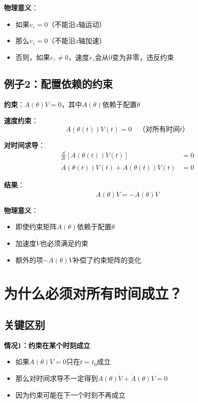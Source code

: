 \documentclass[12pt,a4paper]{article}
\begin{document}
\textbf{物理意义}：
\begin{itemize}
\item 如果$v_z = 0$（不能沿$z$轴运动）
\item 那么$\dot{v}_z = 0$（不能沿$z$轴加速）
\item 否则，如果$\dot{v}_z \neq 0$，速度$v_z$会从$0$变为非零，违反约束
\end{itemize}

\subsection{例子2：配置依赖的约束}

\textbf{约束}：$A(\theta)V = 0$，其中$A(\theta)$依赖于配置$\theta$

\textbf{速度约束}：
\begin{equation}
A(\theta(t))V(t) = 0 \quad \text{（对所有时间$t$）}
\end{equation}

\textbf{对时间求导}：
\begin{align}
\frac{d}{dt}[A(\theta(t))V(t)] &= 0 \\
\dot{A}(\theta(t))V(t) + A(\theta(t))\dot{V}(t) &= 0
\end{align}

\textbf{结果}：
\begin{equation}
A(\theta)\dot{V} = -\dot{A}(\theta)V
\end{equation}

\textbf{物理意义}：
\begin{itemize}
\item 即使约束矩阵$A(\theta)$依赖于配置$\theta$
\item 加速度$\dot{V}$也必须满足约束
\item 额外的项$-\dot{A}(\theta)V$补偿了约束矩阵的变化
\end{itemize}

\section{为什么必须对所有时间成立？}

\subsection{关键区别}

\textbf{情况1：约束在某个时刻成立}
\begin{itemize}
\item 如果$A(\theta)V = 0$只在$t = t_0$成立
\item 那么对时间求导不一定得到$A(\theta)\dot{V} + \dot{A}(\theta)V = 0$
\item 因为约束可能在下一个时刻不再成立
\end{itemize}
\end{document}
